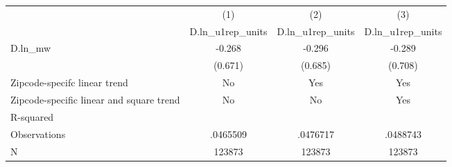 {
\def\sym#1{\ifmmode^{#1}\else\(^{#1}\)\fi}
\begin{tabular}{l*{3}{c}}
\hline\hline
          &\multicolumn{1}{c}{(1)}&\multicolumn{1}{c}{(2)}&\multicolumn{1}{c}{(3)}\\
          &\multicolumn{1}{c}{D.ln\_u1rep\_units}&\multicolumn{1}{c}{D.ln\_u1rep\_units}&\multicolumn{1}{c}{D.ln\_u1rep\_units}\\
\hline
D.ln\_mw   &   -0.268         &   -0.296         &   -0.289         \\
          &  (0.671)         &  (0.685)         &  (0.708)         \\
\hline
Zipcode-specifc linear trend&       No         &      Yes         &      Yes         \\
Zipcode-specific linear and square trend&       No         &       No         &      Yes         \\
R-squared &                  &                  &                  \\
Observations& .0465509         & .0476717         & .0488743         \\
N         &   123873         &   123873         &   123873         \\
\hline\hline
\end{tabular}
}
